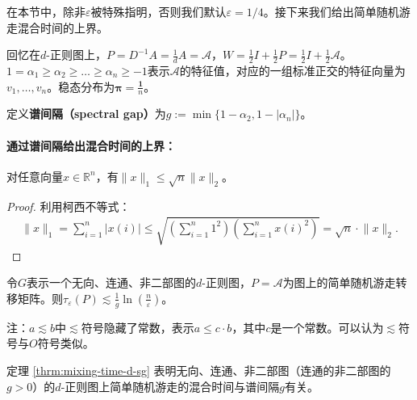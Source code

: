     在本节中，除非$\varepsilon$被特殊指明，否则我们默认$\varepsilon=1/4$。接下来我们给出简单随机游走混合时间的上界。%

    回忆在$d$-正则图上，$P=D^{-1}A=\frac{1}{d}A=\mathcal{A}$，$W=\frac{1}{2}I+\frac{1}{2}P=\frac{1}{2}I+\frac{1}{2}\mathcal{A}$。$1=\alpha_1\ge \alpha_2\ge\dots \ge \alpha_n\ge -1$表示$\mathcal{A}$的特征值，对应的一组标准正交的特征向量为$v_1,\dots,v_n$。稳态分布为$\bm{\pi}=\frac{\bm{1}}{n}$。

    定义\textbf{谱间隔（spectral gap）}为$g:=\min\{1-\alpha_2,1-|\alpha_n|\}$。

    \paragraph{通过谱间隔给出混合时间的上界：}

    \begin{fact}
        \label{fact:norm}
        对任意向量$x\in\mathbb{R}^n$，有$\lVert x\rVert_1\le \sqrt{n}\lVert x\rVert_2$。
        \begin{proof}
            利用柯西不等式：
            \begin{align*}
                \lVert x\rVert_1=\sum_{i=1}^n{|x(i)|}
                \le \sqrt{\left(\sum_{i=1}^n{1^2}\right)\left(\sum_{i=1}^n{x(i)^2}\right)}
                =\sqrt{n}\cdot \lVert x\rVert_2.
            \end{align*}
        \end{proof}
    \end{fact}
                
    \begin{theorem}
        \label{thrm:mixing-time-d-sg}
        令$G$表示一个无向、连通、非二部图的$d$-正则图，$P=\mathcal{A}$为图上的简单随机游走转移矩阵。则$\tau_{\varepsilon}(P)\lesssim\frac{1}{g}\ln{\left(\frac{n}{\varepsilon}\right)}$。
    \end{theorem}

    注：$a \lesssim b$中$\lesssim$符号隐藏了常数，表示$a\le c\cdot b$，其中$c$是一个常数。可以认为$\lesssim$符号与$O$符号类似。

    定理 \ref{thrm:mixing-time-d-sg} 表明无向、连通、非二部图（连通的非二部图的$g>0$）的$d$-正则图上简单随机游走的混合时间与谱间隔$g$有关。

